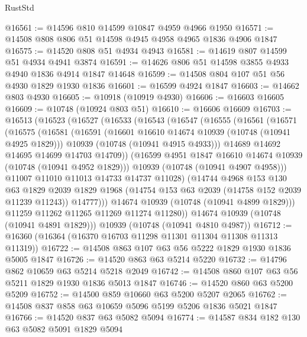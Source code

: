\begin{lexlean}{RustStd}
\begin{coremodule}
{\begin{coremodule}
{{{{{@16561 := @14596 @810 @14599 @10847 @4959 @4966 @1950
@16571 := @14508 @808 @806 @51 @14598 @4945 @4958 @4965 @1836 @4906 @1847
@16575 := @14520 @808 @51 @4934 @4943
@16581 := @14619 @807 @14599 @51 @4934 @4941 @3874
@16591 := @14626 @806 @51 @14598 @3855 @4933 @4940 @1836 @4914 @1847 @14648
@16599 := @14508 @804 @107 @51 @56 @4930 @1829 @1930 @1836
@16601 := @16599 @4924 @1847
@16603 := @14662 @803 @4930
@16605 := @10918 (@10919 @4930)
@16606 := @16603 @16605
@16609 := @10748 (@10924 @803 @51)
@16610 := @16606 @16609
@16703 := @16513
    (@16523
      (@16527
        (@16533
          (@16543
            (@16547
              (@16555
                (@16561
                  (@16571
                    (@16575
                      (@16581
                        (@16591
                          (@16601 @16610 @14674 @10939 (@10748 (@10941 @4925 @1829)))
                          @10939
                          (@10748 (@10941 @4915 @4933)))
                        @14689
                        @14692
                        @14695
                        @14699
                        @14703
                        @14709))
                    (@16599 @4951 @1847 @16610 @14674 @10939 (@10748 (@10941 @4952 @1829)))
                    @10939
                    (@10748 (@10941 @4907 @4958)))
                  @11007
                  @11010
                  @11013
                  @14733
                  @14737
                  @11028)
                (@14744
                  @4968
                  @153
                  @130
                  @63
                  @1829
                  @2039
                  @1829
                  @1968
                  (@14754 @153 @63 @2039 (@14758 @152 @2039 @11239 @11243))
                  @14777)))
            @14674
            @10939
            (@10748 (@10941 @4899 @1829)))
          @11259
          @11262
          @11265
          @11269
          @11274
          @11280))
      @14674
      @10939
      (@10748 (@10941 @4891 @1829)))
    @10939
    (@10748 (@10941 @4810 @4987))
@16712 := @16360 (@16364 (@16370 @16703 @11298 @11301 @11304 @11308 @11313 @11319))
@16722 := @14508 @863 @107 @63 @56 @5222 @1829 @1930 @1836 @5005 @1847
@16726 := @14520 @863 @63 @5214 @5220
@16732 := @14796 @862 @10659 @63 @5214 @5218 @2049
@16742 := @14508 @860 @107 @63 @56 @5211 @1829 @1930 @1836 @5013 @1847
@16746 := @14520 @860 @63 @5200 @5209
@16752 := @14500 @859 @10660 @63 @5200 @5207 @2065
@16762 := @14508 @837 @858 @63 @10659 @5096 @5199 @5206 @1836 @5021 @1847
@16766 := @14520 @837 @63 @5082 @5094
@16774 := @14587 @834 @182 @130 @63 @5082 @5091 @1829 @5094
}}}}}
\end{coremodule}}
\end{coremodule}
\end{lexlean}
